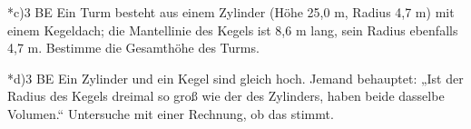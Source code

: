 \documentclass[11pt]{article}
\begin{document}
\begin{pfaufg}{}{*c)}{3 BE}
Ein Turm besteht aus einem Zylinder (Höhe 25,0 m, Radius 4,7 m) mit einem Kegeldach; die Mantellinie des Kegels ist 8,6 m lang, sein Radius ebenfalls 4,7 m. Bestimme die Gesamthöhe des Turms.
\end{pfaufg}
\begin{pfaufg}{}{*d)}{3 BE}
Ein Zylinder und ein Kegel sind gleich hoch. Jemand behauptet: „Ist der Radius des Kegels dreimal so groß wie der des Zylinders, haben beide dasselbe Volumen.“ Untersuche mit einer Rechnung, ob das stimmt.
\end{pfaufg}
\end{document}

